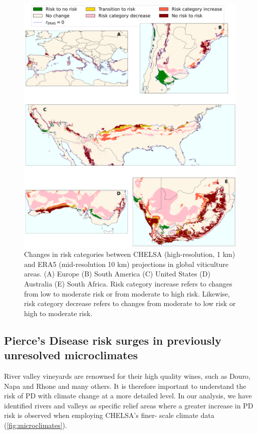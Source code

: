 \begin{figure}[H]
    \centering
    \includegraphics[width=\textwidth]{Figures/ERA5_vs_CHELSA_zones.pdf}
    \caption[Changes in risk categories between due to the climate data
        resolution in global viticulture areas]{Changes in risk categories
        between CHELSA (high-resolution, 1
        km) and ERA5 (mid-resolution 10 km) projections in global viticulture
        areas.
        (A) Europe (B) South America (C) United States (D) Australia (E) South
        Africa.
        Risk category increase refers to changes from low to moderate risk or
        from
        moderate to high risk. Likewise, risk category decrease refers to
        changes from
        moderate to low risk or high to moderate risk.}
    \label{fig:risk_categories_dif}
\end{figure}

\subsection{Pierce's Disease risk surges in previously unresolved
    microclimates}

River valley vineyards are renowned  for their high quality wines, such as
Douro, Napa and Rhone and many others. It is therefore important to understand
the risk of  PD with climate change at	a more detailed level. In our analysis,
we have identified rivers and valleys as specific relief areas where a greater
increase in PD risk is observed when employing CHELSA’s finer- scale climate
data (\cref{fig:microclimates}).

